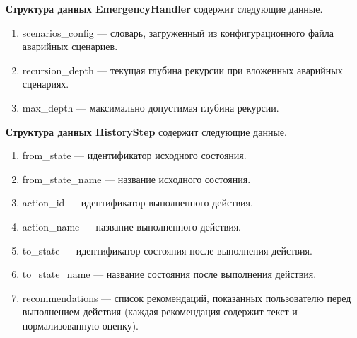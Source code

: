 \textbf{Структура данных EmergencyHandler} содержит следующие данные.
\begin{enumerate}
    \item scenarios\_config --- словарь, загруженный из конфигурационного файла аварийных сценариев.
    \item recursion\_depth --- текущая глубина рекурсии при вложенных аварийных сценариях.
    \item max\_depth --- максимально допустимая глубина рекурсии.
\end{enumerate}

\textbf{Структура данных HistoryStep} содержит следующие данные.
\begin{enumerate}
    \item from\_state --- идентификатор исходного состояния.
    \item from\_state\_name --- название исходного состояния.
    \item action\_id --- идентификатор выполненного действия.
    \item action\_name --- название выполненного действия.
    \item to\_state --- идентификатор состояния после выполнения действия.
    \item to\_state\_name --- название состояния после выполнения действия.
    \item recommendations --- список рекомендаций, показанных пользователю перед выполнением действия (каждая рекомендация содержит текст и нормализованную оценку).
\end{enumerate}


